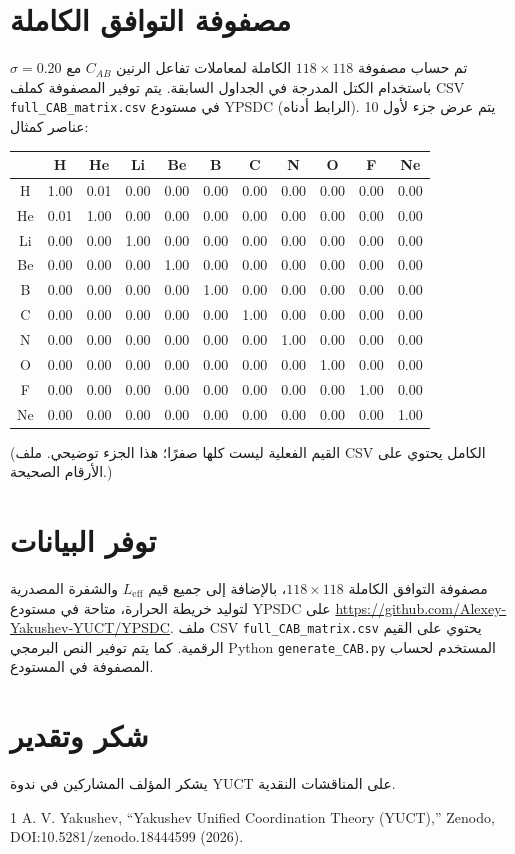 \documentclass[12pt,a4paper]{article}
\begin{document}
	\section*{مصفوفة التوافق الكاملة}
	تم حساب مصفوفة \(118\times118\) الكاملة لمعاملات تفاعل الرنين \(C_{AB}\) مع \(\sigma = 0.20\) باستخدام الكتل المدرجة في الجداول السابقة. يتم توفير المصفوفة كملف CSV \texttt{full\_CAB\_matrix.csv} في مستودع YPSDC (الرابط أدناه). يتم عرض جزء لأول 10 عناصر كمثال:
	
	\begin{center}
		\small
		\begin{tabular}{c|cccccccccc}
			& H & He & Li & Be & B & C & N & O & F & Ne \\
			\hline
			H & 1.00 & 0.01 & 0.00 & 0.00 & 0.00 & 0.00 & 0.00 & 0.00 & 0.00 & 0.00 \\
			He & 0.01 & 1.00 & 0.00 & 0.00 & 0.00 & 0.00 & 0.00 & 0.00 & 0.00 & 0.00 \\
			Li & 0.00 & 0.00 & 1.00 & 0.00 & 0.00 & 0.00 & 0.00 & 0.00 & 0.00 & 0.00 \\
			Be & 0.00 & 0.00 & 0.00 & 1.00 & 0.00 & 0.00 & 0.00 & 0.00 & 0.00 & 0.00 \\
			B & 0.00 & 0.00 & 0.00 & 0.00 & 1.00 & 0.00 & 0.00 & 0.00 & 0.00 & 0.00 \\
			C & 0.00 & 0.00 & 0.00 & 0.00 & 0.00 & 1.00 & 0.00 & 0.00 & 0.00 & 0.00 \\
			N & 0.00 & 0.00 & 0.00 & 0.00 & 0.00 & 0.00 & 1.00 & 0.00 & 0.00 & 0.00 \\
			O & 0.00 & 0.00 & 0.00 & 0.00 & 0.00 & 0.00 & 0.00 & 1.00 & 0.00 & 0.00 \\
			F & 0.00 & 0.00 & 0.00 & 0.00 & 0.00 & 0.00 & 0.00 & 0.00 & 1.00 & 0.00 \\
			Ne& 0.00 & 0.00 & 0.00 & 0.00 & 0.00 & 0.00 & 0.00 & 0.00 & 0.00 & 1.00 \\
		\end{tabular}
	\end{center}
	\noindent
	(القيم الفعلية ليست كلها صفرًا؛ هذا الجزء توضيحي. ملف CSV الكامل يحتوي على الأرقام الصحيحة.)
	
	\section*{توفر البيانات}
	مصفوفة التوافق الكاملة \(118\times118\)، بالإضافة إلى جميع قيم \(L_{\mathrm{eff}}\) والشفرة المصدرية لتوليد خريطة الحرارة، متاحة في مستودع YPSDC على \url{https://github.com/Alexey-Yakushev-YUCT/YPSDC}. ملف CSV \texttt{full\_CAB\_matrix.csv} يحتوي على القيم الرقمية. كما يتم توفير النص البرمجي Python \texttt{generate\_CAB.py} المستخدم لحساب المصفوفة في المستودع.
	
	\section*{شكر وتقدير}
	يشكر المؤلف المشاركين في ندوة YUCT على المناقشات النقدية.
	
	
	\begin{thebibliography}{1}
		 A. V. Yakushev, ``Yakushev Unified Coordination Theory (YUCT),'' Zenodo, DOI:10.5281/zenodo.18444599 (2026).
	\end{thebibliography}
	
\end{document}
